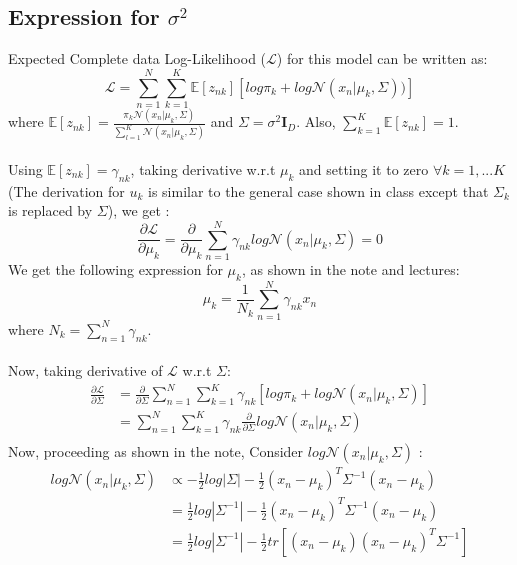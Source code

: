 \documentclass{article}
\begin{document}
\subsection{Expression for $\sigma^2$}
\label{sig}
Expected Complete data Log-Likelihood ($\mathcal{L}$) for this model can be written as:
$$\mathcal{L} = \sum_{n=1}^N \sum_{k=1}^K \mathds{E}[z_{nk}][log\pi_k + log \mathcal{N}(x_n | \mu_k, \Sigma))]$$
where $\mathds{E}[z_{nk}] = \frac{\pi_k \mathcal{N}(x_n| \mu_k, \Sigma)}{\sum_{l=1}^K \mathcal{N}(x_n| \mu_k, \Sigma)}$ and $\Sigma = \sigma^2\textbf{I}_D$. Also, $\sum_{k=1}^K \mathds{E}[z_{nk}]=1$. \\ \\
Using $\mathds{E}[z_{nk}] = \gamma_{nk}$, taking derivative w.r.t $\mu_k$ and setting it to zero $\forall k = 1,...K $(The derivation for $u_k$ is similar to the general case shown in class except that $\Sigma_k$ is replaced by $\Sigma$), we get :
$$ \frac{\partial \mathcal{L}}{\partial \mu_k} = \frac{\partial}{\partial \mu_k} \sum_{n=1}^N \gamma_{nk} log \mathcal{N}(x_n | \mu_k, \Sigma) = 0 $$
We get the following expression for $\mu_k$, as shown in the note and lectures:
$$\mu_k = \frac{1}{N_k}\sum_{n=1}^N \gamma_{nk}x_n$$
where $N_k = \sum_{n=1}^N \gamma_{nk}$. \\ \\
Now, taking derivative of $\mathcal{L}$ w.r.t $\Sigma$:
\begin{equation*}
\begin{aligned}
\frac{\partial \mathcal{L}}{\partial \Sigma} &= \frac{\partial}{\partial \Sigma} \sum_{n=1}^N \sum_{k=1}^K \gamma_{nk}[ log \pi_k + log \mathcal{N}(x_n | \mu_k, \Sigma)] \\
&= \sum_{n=1}^N \sum_{k=1}^K \gamma_{nk} \frac{\partial}{\partial \Sigma} log \mathcal{N}(x_n | \mu_k, \Sigma) \\
\end{aligned}
\end{equation*}
Now, proceeding as shown in the note, Consider $log \mathcal{N}(x_n | \mu_k, \Sigma)$ :
\begin{equation*}
\begin{aligned}
log \mathcal{N}(x_n | \mu_k, \Sigma) &\propto - \frac{1}{2}log|\Sigma| - \frac{1}{2}(x_n- \mu_k)^T\Sigma^{-1}(x_n-\mu_k)\\
&= \frac{1}{2}log|\Sigma^{-1}| - \frac{1}{2}(x_n- \mu_k)^T\Sigma^{-1}(x_n-\mu_k) \\
&= \frac{1}{2}log|\Sigma^{-1}| - \frac{1}{2}tr[(x_n- \mu_k)(x_n-\mu_k)^T\Sigma^{-1} ]\\
\end{aligned}
\end{equation*}
\end{document}

